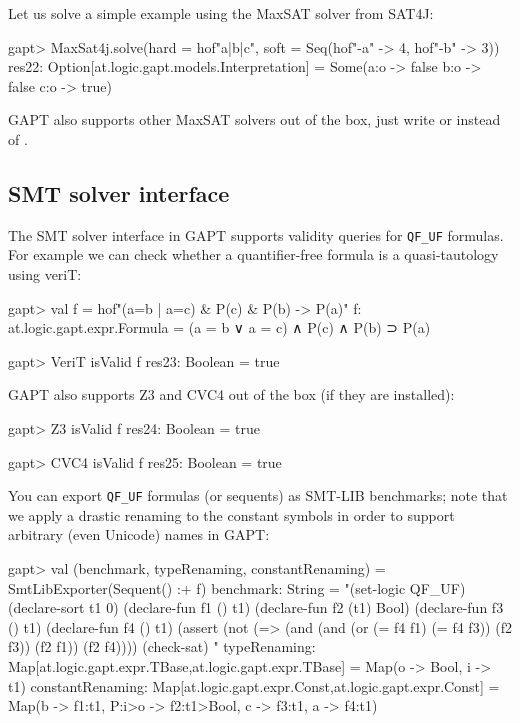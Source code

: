 \documentclass[a4paper,11pt]{article}
\newcommand{\cli}[1]{{\ttfamily {#1}}}
\begin{document}
Let us solve a simple example using the MaxSAT solver from SAT4J:

\begin{clilisting}
gapt> MaxSat4j.solve(hard = hof"a|b|c", soft = Seq(hof"-a" -> 4, hof"-b" -> 3))
res22: Option[at.logic.gapt.models.Interpretation] =
Some(a:o -> false
b:o -> false
c:o -> true)

\end{clilisting}

GAPT also supports other MaxSAT solvers out of the box, just write
\cli{OpenWBO} or \cli{ToySolver} instead of \cli{MaxSat4j}.

\subsection{SMT solver interface}

The SMT solver interface in GAPT supports validity queries for \verb,QF_UF,
formulas.  For example we can check whether a quantifier-free formula is a
quasi-tautology using veriT:
\begin{clilisting}
gapt> val f = hof"(a=b | a=c) & P(c) & P(b) -> P(a)"
f: at.logic.gapt.expr.Formula = (a = b ∨ a = c) ∧ P(c) ∧ P(b) ⊃ P(a)

\end{clilisting}

\begin{clilisting}
gapt> VeriT isValid f
res23: Boolean = true

\end{clilisting}

GAPT also supports Z3 and CVC4 out of the box (if they are installed):
\begin{clilisting}
gapt> Z3 isValid f
res24: Boolean = true

gapt> CVC4 isValid f
res25: Boolean = true

\end{clilisting}

You can export \verb,QF_UF, formulas (or sequents) as SMT-LIB benchmarks;
note that we apply a drastic renaming to the constant symbols in order to
support arbitrary (even Unicode) names in GAPT:
\begin{clilisting}
gapt> val (benchmark, typeRenaming, constantRenaming) = SmtLibExporter(Sequent() :+ f)
benchmark: String =
"(set-logic QF_UF)
(declare-sort t1 0)
(declare-fun f1 () t1)
(declare-fun f2 (t1) Bool)
(declare-fun f3 () t1)
(declare-fun f4 () t1)
(assert (not (=> (and (and (or (= f4 f1) (= f4 f3)) (f2 f3)) (f2 f1)) (f2 f4))))
(check-sat)
"
typeRenaming: Map[at.logic.gapt.expr.TBase,at.logic.gapt.expr.TBase] = Map(o -> Bool, i -> t1)
constantRenaming: Map[at.logic.gapt.expr.Const,at.logic.gapt.expr.Const] = Map(b -> f1:t1, P:i>o -> f2:t1>Bool, c -> f3:t1, a -> f4:t1)

\end{clilisting}
\end{document}
